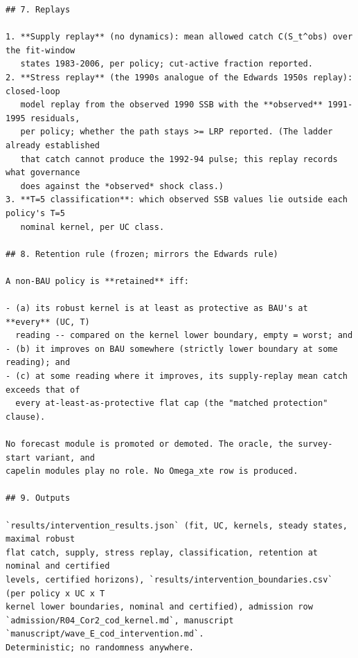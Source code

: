 \begin{footnotesize}
\begin{verbatim}
## 7. Replays

1. **Supply replay** (no dynamics): mean allowed catch C(S_t^obs) over the fit-window
   states 1983-2006, per policy; cut-active fraction reported.
2. **Stress replay** (the 1990s analogue of the Edwards 1950s replay): closed-loop
   model replay from the observed 1990 SSB with the **observed** 1991-1995 residuals,
   per policy; whether the path stays >= LRP reported. (The ladder already established
   that catch cannot produce the 1992-94 pulse; this replay records what governance
   does against the *observed* shock class.)
3. **T=5 classification**: which observed SSB values lie outside each policy's T=5
   nominal kernel, per UC class.

## 8. Retention rule (frozen; mirrors the Edwards rule)

A non-BAU policy is **retained** iff:

- (a) its robust kernel is at least as protective as BAU's at **every** (UC, T)
  reading -- compared on the kernel lower boundary, empty = worst; and
- (b) it improves on BAU somewhere (strictly lower boundary at some reading); and
- (c) at some reading where it improves, its supply-replay mean catch exceeds that of
  every at-least-as-protective flat cap (the "matched protection" clause).

No forecast module is promoted or demoted. The oracle, the survey-start variant, and
capelin modules play no role. No Omega_xte row is produced.

## 9. Outputs

`results/intervention_results.json` (fit, UC, kernels, steady states, maximal robust
flat catch, supply, stress replay, classification, retention at nominal and certified
levels, certified horizons), `results/intervention_boundaries.csv` (per policy x UC x T
kernel lower boundaries, nominal and certified), admission row
`admission/R04_Cor2_cod_kernel.md`, manuscript `manuscript/wave_E_cod_intervention.md`.
Deterministic; no randomness anywhere.

\end{verbatim}\end{footnotesize}
